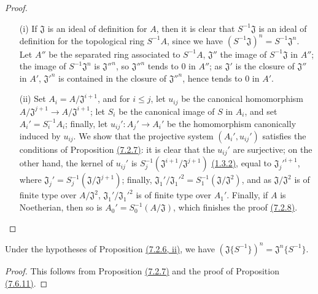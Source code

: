 \begin{proof}
\label{proof-prop-7.6.11}
\medskip\noindent
\begin{itemize}
  \item[(i)] If $\mathfrak{J}$ is an ideal of definition for $A$, then it is clear that
    $S^{-1}\mathfrak{J}$ is an ideal of definition for the topological ring $S^{-1}A$, since we
    have $(S^{-1}\mathfrak{J})^n=S^{-1}\mathfrak{J}^n$. Let $A''$ be the separated ring associated
    to $S^{-1}A$, $\mathfrak{J}''$ the image of $S^{-1}\mathfrak{J}$ in $A''$; the image of
    $S^{-1}\mathfrak{J}^n$ is ${\mathfrak{J}''}^n$, so ${\mathfrak{J}''}^n$ tends to $0$ in $A''$;
    as $\mathfrak{J}'$ is the closure of $\mathfrak{J}''$ in $A'$, ${\mathfrak{J}'}^n$ is contained
    in the closure of ${\mathfrak{J}''}^n$, hence tends to $0$ in $A'$.
  \item[(ii)] Set $A_i=A/\mathfrak{J}^{i+1}$, and for $i\leqslant j$, let $u_{ij}$ be the canonical
    homomorphism $A/\mathfrak{J}^{j+1}\to A/\mathfrak{J}^{i+1}$; let $S_i$ be the canonical image of
    $S$ in $A_i$, and set $A_i'=S_i^{-1}A_i$; finally, let $u_{ij}':A_j'\to A_i'$ be the homomorphism
    canonically induced by $u_{ij}$. We show that the projective system $(A_i',u_{ij}')$ satisfies
    the conditions of Proposition \hyperref[prop-0.7.2.7]{(7.2.7)}: it is clear that the $u_{ij}'$
    are surjective; on the other hand, the kernel of $u_{ij}'$ is
    $S_j^{-1}(\mathfrak{J}^{i+1}/\mathfrak{J}^{j+1})$ \hyperref[env-0.1.3.2]{(1.3.2)}, equal to
    ${\mathfrak{J}_j'}^{i+1}$, where $\mathfrak{J}_j'=S_j^{-1}(\mathfrak{J}/\mathfrak{J}^{j+1})$;
    finally, $\mathfrak{J}_1'/{\mathfrak{J}_1'}^2=S_1^{-1}(\mathfrak{J}/\mathfrak{J}^2)$, and as
    $\mathfrak{J}/\mathfrak{J}^2$ is of finite type over $A/\mathfrak{J}^2$,
    $\mathfrak{J}_1'/{\mathfrak{J}_1'}^2$ is of finite type over $A_1'$. Finally, if $A$ is
    Noetherian, then so is $A_0'=S_0^{-1}(A/\mathfrak{J})$, which finishes the proof
    \hyperref[cor-0.7.2.8]{(7.2.8)}.
\end{itemize}
\end{proof}

\begin{cor}[7.6.12]
\label{cor-0.7.6.12}
Under the hypotheses of Proposition \hyperref[prop-0.7.6.11]{(7.2.6, ii)}, we have
$(\mathfrak{J}\{S^{-1}\})^n=\mathfrak{J}^n\{S^{-1}\}$.
\end{cor}

\begin{proof}
\label{proof-cor-0.7.6.12}
This follows from Proposition \hyperref[prop-0.7.2.7]{(7.2.7)} and the proof of
Proposition \hyperref[prop-0.7.6.11]{(7.6.11)}.
\end{proof}

